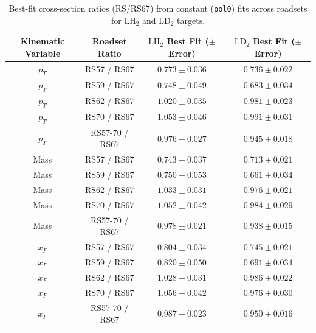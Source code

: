 \begin{table}[htbp]
\centering
\caption{Best-fit cross-section ratios ($\text{RS} / \text{RS67}$) from constant (\texttt{pol0}) fits across roadsets for $\text{LH}_2$ and $\text{LD}_2$ targets.}
\label{tab:xsec_ratios_vs_rs67}
\begin{tabular}{|c|c|c|c|}
\hline
\textbf{Kinematic Variable} & \textbf{Roadset Ratio} & \textbf{$\text{LH}_2$ Best Fit ($\pm$ Error)} & \textbf{$\text{LD}_2$ Best Fit ($\pm$ Error)} \\
\hline
$p_T$ & RS57 / RS67 & $0.773 \pm 0.036$ & $0.736 \pm 0.022$ \\
\hline
$p_T$ & RS59 / RS67 & $0.748 \pm 0.049$ & $0.683 \pm 0.034$ \\
\hline
$p_T$ & RS62 / RS67 & $1.020 \pm 0.035$ & $0.981 \pm 0.023$ \\
\hline
$p_T$ & RS70 / RS67 & $1.053 \pm 0.046$ & $0.991 \pm 0.031$ \\
\hline
$p_T$ & RS57-70 / RS67 & $0.976 \pm 0.027$ & $0.945 \pm 0.018$ \\
\hline
Mass & RS57 / RS67 & $0.743 \pm 0.037$ & $0.713 \pm 0.021$ \\
\hline
Mass & RS59 / RS67 & $0.750 \pm 0.053$ & $0.661 \pm 0.034$ \\
\hline
Mass & RS62 / RS67 & $1.033 \pm 0.031$ & $0.976 \pm 0.021$ \\
\hline
Mass & RS70 / RS67 & $1.052 \pm 0.042$ & $0.984 \pm 0.029$ \\
\hline
Mass & RS57-70 / RS67 & $0.978 \pm 0.021$ & $0.938 \pm 0.015$ \\
\hline
$x_F$ & RS57 / RS67 & $0.804 \pm 0.034$ & $0.745 \pm 0.021$ \\
\hline
$x_F$ & RS59 / RS67 & $0.820 \pm 0.050$ & $0.691 \pm 0.034$ \\
\hline
$x_F$ & RS62 / RS67 & $1.028 \pm 0.031$ & $0.986 \pm 0.022$ \\
\hline
$x_F$ & RS70 / RS67 & $1.056 \pm 0.042$ & $0.976 \pm 0.030$ \\
\hline
$x_F$ & RS57-70 / RS67 & $0.987 \pm 0.023$ & $0.950 \pm 0.016$ \\
\hline
\end{tabular}
\end{table}
